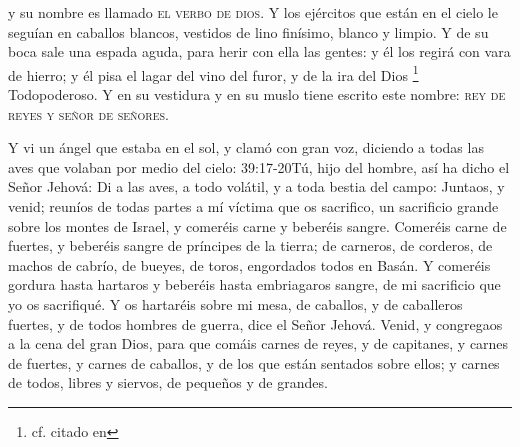  y su nombre es llamado \textsc{el verbo de dios}.
Y los ejércitos que están en el cielo le seguían en caballos blancos, vestidos de lino finísimo, blanco y limpio.
Y de su boca sale una espada aguda,%
 para herir con ella las gentes: y él los regirá con vara de hierro;%
 y él pisa el lagar del vino del furor, y de la ira del Dios%
	\footnote{cf.  citado en }
 Todopoderoso. 
Y en su vestidura y en su muslo tiene escrito este nombre: \textsc{rey de reyes y señor de señores}.%

Y vi un ángel que estaba en el sol, y clamó con gran voz, diciendo a todas las aves que volaban por medio del cielo:%
							{39:17-20}{Tú, hijo del hombre, así ha dicho el Señor Jehová: Di a las aves, a todo volátil, y a toda bestia del campo: Juntaos, y venid; reuníos de todas partes a mí víctima que os sacrifico, un sacrificio grande sobre los montes de Israel, y comeréis carne y beberéis sangre. Comeréis carne de fuertes, y beberéis sangre de príncipes de la tierra; de carneros, de corderos, de machos de cabrío, de bueyes, de toros, engordados todos en Basán. Y comeréis gordura hasta hartaros y beberéis hasta embriagaros sangre, de mi sacrificio que yo os sacrifiqué. Y os hartaréis sobre mi mesa, de caballos, y de caballeros fuertes, y de todos hombres de guerra, dice el Señor Jehová.}
 Venid, y congregaos a la cena del gran Dios, 
para que comáis carnes de reyes, y de capitanes, y carnes de fuertes, y carnes de caballos, y de los que están sentados sobre ellos; y carnes de todos, libres y siervos, de pequeños y de grandes.

